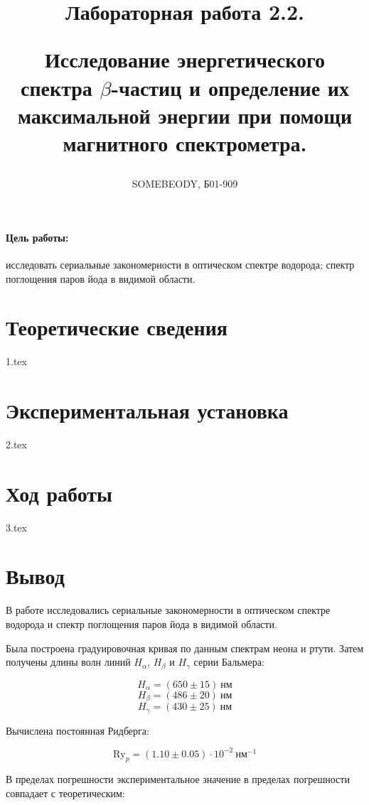\documentclass[a5paper, 10pt, twoside]{article} %
\title
{\hfill \break  \hfill \break
\hfill \break  \hfill \break
Лабораторная работа 2.2.

Исследование энергетического спектра $\beta$-частиц и определение их
максимальной энергии при помощи магнитного спектрометра.}
\author{SOMEBEODY, Б01-909}
\begin{document}
\maketitle



\thispagestyle{empty} %

\newpage

\tableofcontents %
\thispagestyle{plain}
\newpage


\paragraph{Цель работы:}
исследовать сериальные закономерности в оптическом спектре водорода; спектр
поглощения паров йода в видимой области.

\section{Теоретические сведения}
{1.tex}

\newpage
\section{Экспериментальная установка}
{2.tex}

\newpage
\section{Ход работы}
{3.tex}

\newpage
\section{Вывод}

В работе исследовались сериальные закономерности в оптическом спектре водорода и
спектр поглощения паров йода в видимой области.

Была построена градуировочная кривая по данным спектрам неона и ртути. Затем
получены длины волн линий $H_{\alpha}$, $H_{\beta}$ и $H_{\gamma}$ серии
Бальмера:

\[  H_{\alpha} = (650\pm 15)\ \text{нм} \]
\[  H_{\beta} = (486\pm 20)\ \text{нм} \]
\[  H_{\gamma} = (430\pm  25)\  \text{нм} \]


Вычислена постоянная Ридберга:

\[ \text{Ry}_p=(1.10\pm 0.05)\cdot 10^{-2} ~\text{нм}^{-1} \]

В пределах погрешности экспериментальное значение в пределах погрешности
совпадает с теоретическим:
\end{document}
